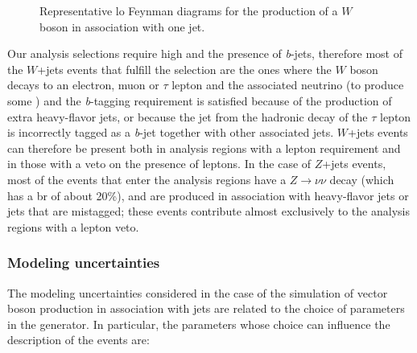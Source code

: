 \begin{figure}[h]
\centering 
{}
\caption{Representative \gls{lo} Feynman diagrams for the production of a $W$ boson in association with one jet.}\label{fig:W_prod}
\end{figure}

Our analysis selections require high \met and the presence of \textit{b}-jets, therefore most of the $W$+jets events that fulfill the selection are the ones where the $W$ boson decays to an electron, muon or $\tau$ lepton 
and the associated neutrino (to produce some \met) and the \textit{b}-tagging requirement is satisfied because of the production of extra heavy-flavor jets, or because the jet from the hadronic decay of the $\tau$
lepton is incorrectly tagged as a \textit{b}-jet together with other associated jets. 
$W$+jets events can therefore be present both in analysis regions with a lepton requirement and in those with a veto on the presence of leptons. 
In the case of $Z$+jets events, most of the events that enter the analysis regions have a $Z \to \nu \nu$ decay (which has a \gls{br} of about 20\%), and are produced in association with 
heavy-flavor jets or jets that are mistagged; these events contribute almost exclusively to the analysis regions with a lepton veto. 

\subsubsection*{Modeling uncertainties}

The modeling uncertainties considered in the case of the simulation of vector boson production in association with jets are related to the choice of parameters in the \Sherpa generator. 
In particular, the parameters whose choice can influence the description of the events are:

